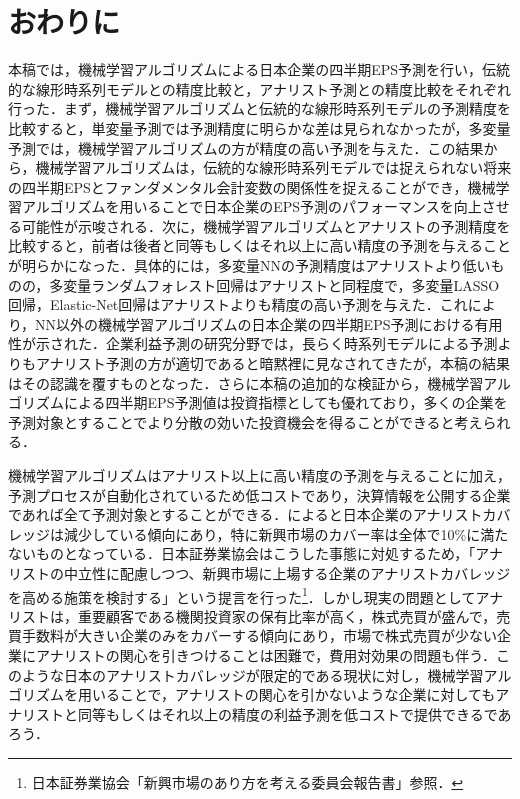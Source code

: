 \documentclass[a4paper，11pt]{jsarticle}
\begin{document}
\part{おわりに} \label{par:conclusion}

本稿では，機械学習アルゴリズムによる日本企業の四半期EPS予測を行い，伝統的な線形時系列モデルとの精度比較と，アナリスト予測との精度比較をそれぞれ行った．まず，機械学習アルゴリズムと伝統的な線形時系列モデルの予測精度を比較すると，単変量予測では予測精度に明らかな差は見られなかったが，多変量予測では，機械学習アルゴリズムの方が精度の高い予測を与えた．この結果から，機械学習アルゴリズムは，伝統的な線形時系列モデルでは捉えられない将来の四半期EPSとファンダメンタル会計変数の関係性を捉えることができ，機械学習アルゴリズムを用いることで日本企業のEPS予測のパフォーマンスを向上させる可能性が示唆される．次に，機械学習アルゴリズムとアナリストの予測精度を比較すると，前者は後者と同等もしくはそれ以上に高い精度の予測を与えることが明らかになった．具体的には，多変量NNの予測精度はアナリストより低いものの，多変量ランダムフォレスト回帰はアナリストと同程度で，多変量LASSO回帰，Elastic-Net回帰はアナリストよりも精度の高い予測を与えた．これにより，NN以外の機械学習アルゴリズムの日本企業の四半期EPS予測における有用性が示された．企業利益予測の研究分野では，長らく時系列モデルによる予測よりもアナリスト予測の方が適切であると暗黙裡に見なされてきたが，本稿の結果はその認識を覆すものとなった．さらに本稿の追加的な検証から，機械学習アルゴリズムによる四半期EPS予測値は投資指標としても優れており，多くの企業を予測対象とすることでより分散の効いた投資機会を得ることができると考えられる．

機械学習アルゴリズムはアナリスト以上に高い精度の予測を与えることに加え，予測プロセスが自動化されているため低コストであり，決算情報を公開する企業であれば全て予測対象とすることができる．\cite{yoneyama2010}によると日本企業のアナリストカバレッジは減少している傾向にあり，特に新興市場のカバー率は全体で10\%に満たないものとなっている．日本証券業協会はこうした事態に対処するため，「アナリストの中立性に配慮しつつ、新興市場に上場する企業のアナリストカバレッジを高める施策を検討する」という提言を行った\footnote{日本証券業協会「新興市場のあり方を考える委員会報告書」参照．}．しかし現実の問題としてアナリストは，重要顧客である機関投資家の保有比率が高く，株式売買が盛んで，売買手数料が大きい企業のみをカバーする傾向にあり\citep{nakai2006}，市場で株式売買が少ない企業にアナリストの関心を引きつけることは困難で，費用対効果の問題も伴う．このような日本のアナリストカバレッジが限定的である現状に対し，機械学習アルゴリズムを用いることで，アナリストの関心を引かないような企業に対してもアナリストと同等もしくはそれ以上の精度の利益予測を低コストで提供できるであろう．
\end{document}

